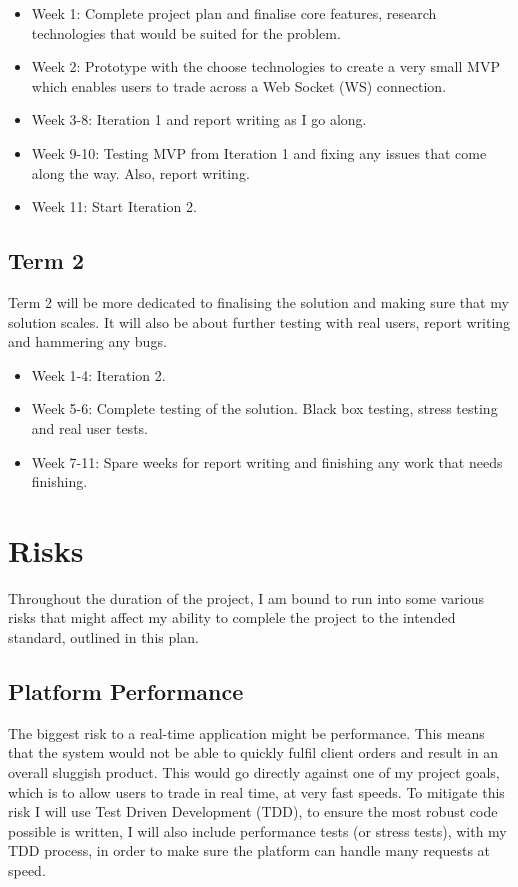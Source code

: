 \documentclass[titlepage]{article}
\begin{document}
\begin{itemize}
	\item Week 1: Complete project plan and finalise core features, research technologies that would be suited for the problem.
	\item Week 2: Prototype with the choose technologies to create a very small MVP which enables users to trade across a Web Socket (WS) connection.
	\item Week 3-8: Iteration 1 and report writing as I go along.
	\item Week 9-10: Testing MVP from Iteration 1 and fixing any issues that come along the way. Also, report writing.
	\item Week 11: Start Iteration 2.
\end{itemize}

\subsection{Term 2}
Term 2 will be more dedicated to finalising the solution and making sure that my solution scales. It will also be about further testing with real users, report writing and hammering any bugs.

\begin{itemize}
	\item Week 1-4: Iteration 2.
	\item Week 5-6: Complete testing of the solution. Black box testing, stress testing and real user tests.
	\item Week 7-11: Spare weeks for report writing and finishing any work that needs finishing.
\end{itemize}

\pagebreak

\section{Risks}
Throughout  the duration of the project, I am bound to run into some various risks that might affect my ability to complele the project to the intended standard, outlined in this plan.

\subsection{Platform Performance}
The biggest risk to a real-time application might be performance. This means that the system would not be able to quickly fulfil client orders and result in an overall sluggish product. This would go directly against one of my project goals, which is to allow users to trade in real time, at very fast speeds. To mitigate this risk I will use Test Driven Development (TDD), to ensure the most robust code possible is written, I will also include performance tests (or stress tests), with my TDD process, in order to make sure the platform can handle many requests at speed.
\end{document}

